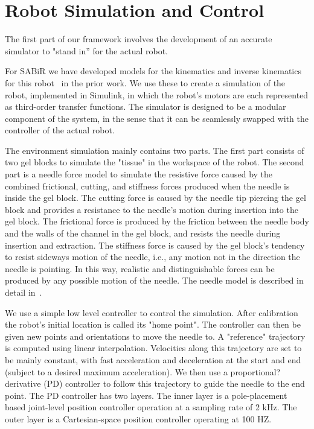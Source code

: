 \section{Robot Simulation and Control}\label{robotsimulator}
The first part of our framework involves the development of an accurate simulator to "stand in'' for the actual robot. 

For SABiR we have developed models for the kinematics and inverse kinematics for this robot~\cite{hwang2009kinematic} in the prior work. We use these to create a simulation of the robot, implemented in Simulink, in which the robot’s motors are each represented as third-order transfer functions. The simulator is designed to be a modular component of the system, in the sense that it can be seamlessly swapped with the controller of the actual robot.

The environment simulation mainly contains two parts. The first part consists of two gel blocks to simulate the "tissue" in the workspace of the robot.  The second part is a needle force model to simulate the resistive force caused by the combined frictional, cutting, and stiffness forces produced when the needle is inside the gel block. The cutting force is caused by the needle tip piercing the gel block and provides a resistance to the needle’s motion during insertion into the gel block.  The frictional force is produced by the friction between the needle body and the walls of the channel in the gel block, and resists the needle during insertion and extraction. The stiffness force is caused by the gel block’s tendency to resist sideways motion of the needle, i.e., any motion not in the direction the needle is pointing. In this way, realistic and distinguishable forces can be produced by any possible motion of the needle. The needle model is described in detail in~\cite{Russell2012}.

We use a simple low level controller to control the simulation. After calibration the robot’s initial location is called its "home point". The controller can then be given new points and orientations to move the needle to. A "reference" trajectory is computed using linear interpolation. Velocities along this trajectory are set to be mainly constant, with fast acceleration and deceleration at the start and end (subject to a desired maximum acceleration). We then use a proportional?derivative (PD) controller to follow this trajectory to guide the needle to the end point. The PD controller has two layers. The inner layer is a pole-placement based joint-level position controller operation at a sampling rate of 2 kHz. The outer layer is a Cartesian-space position controller operating at 100 HZ.


